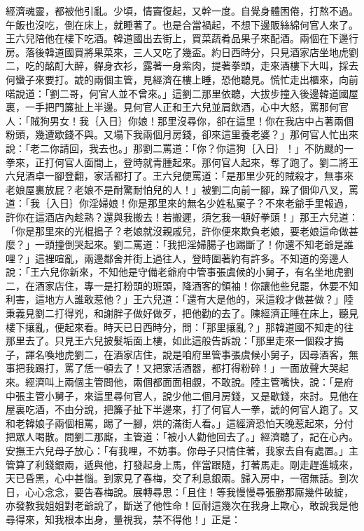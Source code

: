 \begin{showcontents}{}
經濟魂靈，都被他引亂。少頃，情竇復起，又幹一度。自覺身體困倦，打熬不過。午飯也沒吃，倒在床上，就睡著了。也是合當禍起，不想下邊販絲綿何官人來了。王六兒陪他在樓下吃酒。韓道國出去街上，買菜蔬肴品果子來配酒。兩個在下邊行房。落後韓道國買將果菜來，三人又吃了幾盃。約日西時分，只見酒家店坐地虎劉二，吃的酩酊大醉，軃身衣衫，露著一身紫肉，提著拳頭，走來酒樓下大叫，採去何蠻子來要打。諕的兩個主管，見經濟在樓上睡，恐他聽見。慌忙走出櫃來，向前喏說道：「劉二哥，何官人並不曾來。」這劉二那里依聽，大拔步撞入後邊韓道國屋裏，一手把門簾扯上半邊。見何官人正和王六兒並肩飲酒，心中大怒，罵那何官人：「賊狗男女！我｛入日｝你娘！那里沒尋你，卻在這里！你在我店中占著兩個粉頭，幾遭歇錢不與。又塌下我兩個月房錢，卻來這里養老婆？」那何官人忙出來說：「老二你請回，我去也。」那劉二罵道：「你？你這狗｛入日｝！」不防颼的一拳來，正打何官人面間上，登時就青腫起來。那何官人起來，奪了跑了。劉二將王六兒酒卓一腳登翻，家活都打了。王六兒便罵道：「是那里少死的賊殺才，無事來老娘屋裏放屁？老娘不是耐驚耐怕兒的人！」被劉二向前一腳，跺了個仰八叉，罵道：「我｛入日｝你淫婦娘！你是那里來的無名少姓私窠子？不來老爺手里報過，許你在這酒店內趁熟？還與我搬去！若搬遲，須乞我一頓好拳頭！」那王六兒道：「你是那里來的光棍搗子？老娘就沒親戚兒，許你便來欺負老娘，要老娘這命做甚麼？」一頭撞倒哭起來。劉二罵道：「我把淫婦腸子也踢斷了！你還不知老爺是誰哩？」這裡喧亂，兩邊鄰舍并街上過往人，登時圍著約有許多。不知道的旁邊人說：「王六兒你新來，不知他是守備老爺府中管事張虞候的小舅子，有名坐地虎劉二，在酒家店住，專一是打粉頭的班頭，降酒客的領袖！你讓他些兒罷，休要不知利害，這地方人誰敢惹他？」王六兒道：「還有大是他的，采這殺才做甚做？」陸秉義見劉二打得兇，和謝胖子做好做歹，把他勸的去了。陳經濟正睡在床上，聽見樓下攘亂，便起來看。時天已日西時分，問：「那里攘亂？」那韓道國不知走的往那里去了。只見王六兒披髮垢面上樓，如此這般告訴說：「那里走來一個殺才搗子，諢名喚地虎劉二，在酒家店住，說是咱府里管事張虞候小舅子，因尋酒客，無事把我踢打，罵了恁一頓去了！又把家活酒器，都打得粉碎！」一面放聲大哭起來。經濟叫上兩個主管問他，兩個都面面相覷，不敢說。陸主管嘴快，說：「是府中張主管小舅子，來這里尋何官人，說少他二個月房錢，又是歇錢，來討。見他在屋裏吃酒，不由分說，把簾子扯下半邊來，打了何官人一拳，諕的何官人跑了。又和老韓娘子兩個相罵，踢了一腳，烘的滿街人看。」這經濟恐怕天晚惹起來，分付把眾人喝散。問劉二那廝，主管道：「被小人勸他回去了。」經濟聽了，記在心內。安撫王六兒母子放心：「有我哩，不妨事。你母子只情住著，我家去自有處置。」主管算了利錢銀兩，遞與他，打發起身上馬，伴當跟隨，打著馬走。剛走趕進城來，天已昏黑，心中甚惱。到家見了春梅，交了利息銀兩。歸入房中，一宿無話。到次日，心心念念，要告春梅說。展轉尋思：「且住！等我慢慢尋張勝那廝幾件破綻，亦發教我姐姐對老爺說了，斷送了他性命！叵耐這幾次在我身上欺心，敢說我是他尋得來，知我根本出身，量視我，禁不得他！」正是：


\end{showcontents}
